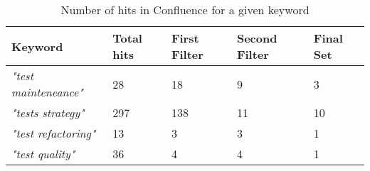 \begin{table}[htb]
	\centering
	\caption{Number of hits in Confluence for a given keyword}
	\label{tab:confluenceMiningResults}
	\begin{tabulary}{\textwidth}{|L|L|L|L|L|}
		\hline
		\textbf{Keyword} & 
		\textbf{Total hits} &
		\textbf{First Filter} &
		\textbf{Second Filter} &
		\textbf{Final Set}
		\\ \hline
		
		\textit{"test mainteneance"} &
		28 &
		18 &
		9  &
		3  \\ 
		\hline
		
		\textit{"tests strategy"} &
		297 &
		138 &
		11 &
		10 \\ 
		\hline
		
		\textit{"test refactoring"} &
		13 &
		3 &
		3 &
		1 \\ 
		\hline
		
		\textit{"test quality"} &
		36 &
		4 &
		4 &
		1 \\ 
		\hline
		

	\end{tabulary}		
\end{table}